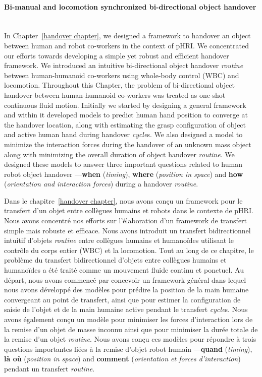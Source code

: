 \paragraph*{\LARGE {Bi-manual and locomotion synchronized bi-directional object handover \\}\\}

In Chapter~\ref{handover chapter}, we designed a framework to handover an object between human and robot co-workers in the context of pHRI. We concentrated our efforts towards developing a simple yet robust and efficient handover framework. We introduced an intuitive bi-directional object handover \textit{routine} between human-humanoid co-workers using whole-body control (WBC) and locomotion. Throughout this Chapter, the problem of bi-directional object handover between human-humanoid co-workers was treated as one-shot continuous fluid motion. Initially we started by designing a general framework and within it developed models to predict human hand position to converge at the handover location, along with estimating the grasp configuration of object and active human hand during handover \textit{cycle}s. We also designed a model to minimize the interaction forces during the handover of an unknown mass object along with minimizing the overall duration of object handover \textit{routine}. We designed these models to answer three important questions related to human robot object handover ---\textbf{when} (\textit{timing}), \textbf{where} (\textit{position in space}) and \textbf{how} (\textit{orientation and interaction forces}) during a handover \textit{routine}.

Dans le chapitre~\ref{handover chapter}, nous avons conçu un framework pour le transfert d'un objet entre collègues humains et robots dans le contexte de pHRI. Nous avons concentré nos efforts sur l'élaboration d'un framework de transfert simple mais robuste et efficace. Nous avons introduit un transfert bidirectionnel intuitif d'objets \textit{routine} entre collègues humains et humanoïdes utilisant le contrôle du corps entier (WBC) et la locomotion. Tout au long de ce chapitre, le problème du transfert bidirectionnel d'objets entre collègues humains et humanoïdes a été traité comme un mouvement fluide continu et ponctuel. Au départ, nous avons commencé par concevoir un framework général dans lequel nous avons développé des modèles pour prédire la position de la main humaine convergeant au point de transfert, ainsi que pour estimer la configuration de saisie de l'objet et de la main humaine active pendant le transfert \textit{cycle}s. Nous avons également conçu un modèle pour minimiser les forces d'interaction lors de la remise d'un objet de masse inconnu ainsi que pour minimiser la durée totale de la remise d'un objet \textit{routine}. Nous avons conçu ces modèles pour répondre à trois questions importantes liées à la remise d'objet robot humain ---\textbf{quand} (\textit{timing}), \textbf{là où} (\textit{position in space}) and \textbf{comment} (\textit{orientation et forces d'interaction}) pendant un transfert \textit{routine}.



